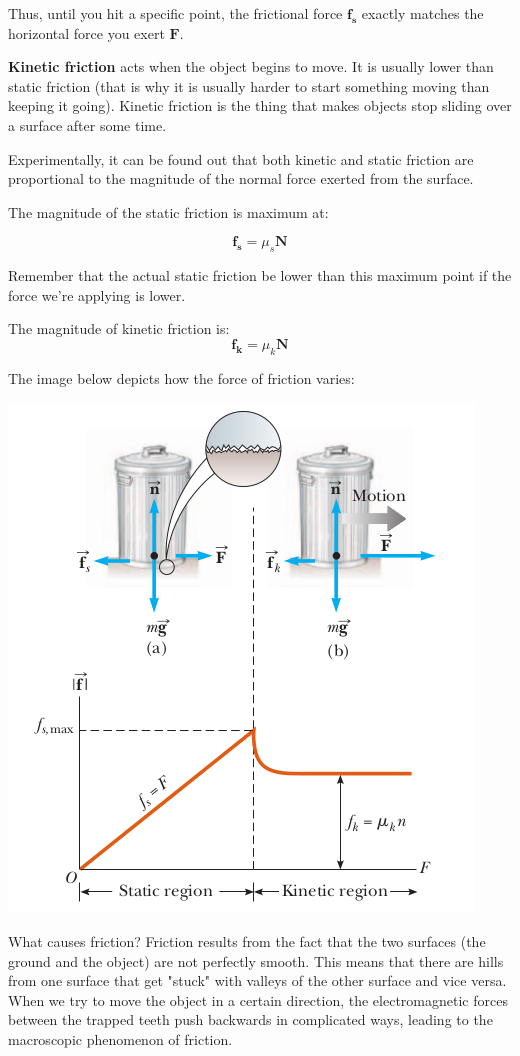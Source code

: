 \documentclass{report}
\begin{document}
Thus, until you hit a specific point, the frictional force $\mathbf{f_s}$ exactly matches the horizontal force you exert $\mathbf{F}$.

\textbf{Kinetic friction} acts when the object begins to move. It is usually lower than static friction (that is why it is usually harder to start something moving than keeping it going). Kinetic friction is the thing that makes objects stop sliding over a surface after some time.

Experimentally, it can be found out that both kinetic and static friction are proportional to the magnitude of the normal force exerted from the surface.

The magnitude of the static friction is maximum at:

$$\mathbf{f_s} = \mu_s\mathbf{N}$$

Remember that the actual static friction be lower than this maximum point if the force we're applying is lower.

The magnitude of kinetic friction is:
$$\mathbf{f_k} = \mu_k\mathbf{N}$$

The image below depicts how the force of friction varies:

\includegraphics[scale=0.5]{friction.png}

What causes friction? Friction results from the fact that the two surfaces (the ground and the object) are not perfectly smooth. This means that there are hills from one surface that get "stuck" with valleys of the other surface and vice versa. When we try to move the object in a certain direction, the electromagnetic forces between the trapped teeth push backwards in complicated ways, leading to the macroscopic phenomenon of friction.
\end{document}
